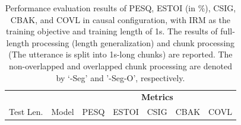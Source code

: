 \begin{table}[!t]
    \centering
    \scriptsize
    \small
    \def\arraystretch{0.91}
    \setlength{\tabcolsep}{3.0pt}
    \setlength{\abovetopsep}{0pt}
    \setlength\belowbottomsep{0pt} 
    \setlength\aboverulesep{0pt} 
    \setlength\belowrulesep{0pt}
    \caption{Performance evaluation results of PESQ, ESTOI (in \%), CSIG, CBAK, and COVL in causal configuration, with IRM as the training objective and training length of 1s. The results of full-length processing (length generalization) and chunk processing (The utterance is split into 1s-long chunks) are reported. The non-overlapped and overlapped chunk processing are denoted by `-Seg' and '-Seg-O', respectively.  
    }
    \label{tab:magirm1s_causeg}
    \begin{tabular}{@{}cl||ccccc@{}}
        \toprule[1.25pt]
         &  & \multicolumn{5}{c}{\textbf{Metrics}}\\  
        Test Len. & Model & PESQ & ESTOI & CSIG & CBAK & COVL\\  
        
        \hline
        \hline
            

\end{tabular}
\end{table}
